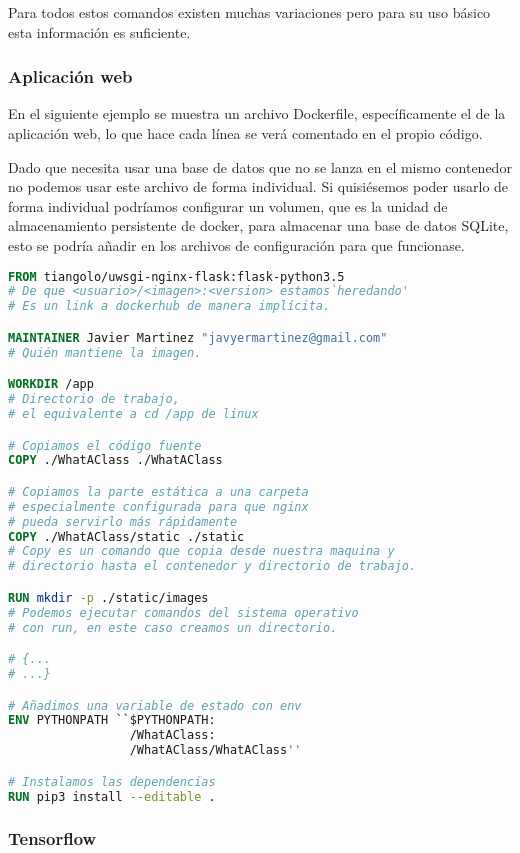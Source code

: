 Para todos estos comandos existen muchas variaciones pero para su uso básico esta información es suficiente.


\subsubsection{Aplicación web}

En el siguiente ejemplo se muestra un archivo Dockerfile, específicamente el de la aplicación web, lo que hace cada línea se verá comentado en el propio código. 

Dado que necesita usar una base de datos que no se lanza en el mismo contenedor no podemos usar este archivo de forma individual. Si quisiésemos poder usarlo de forma individual podríamos configurar un volumen, que es la unidad de almacenamiento persistente de docker, para almacenar una base de datos SQLite, esto se podría añadir en los archivos de configuración para que funcionase.


\lstset{style=blockstyle}
\begin{lstlisting}[language=dockerfile]
FROM tiangolo/uwsgi-nginx-flask:flask-python3.5
# De que <usuario>/<imagen>:<version> estamos`heredando'
# Es un link a dockerhub de manera implícita.

MAINTAINER Javier Martinez "javyermartinez@gmail.com"
# Quién mantiene la imagen.

WORKDIR /app
# Directorio de trabajo, 
# el equivalente a cd /app de linux

# Copiamos el código fuente 
COPY ./WhatAClass ./WhatAClass

# Copiamos la parte estática a una carpeta 
# especialmente configurada para que nginx 
# pueda servirlo más rápidamente
COPY ./WhatAClass/static ./static
# Copy es un comando que copia desde nuestra maquina y 
# directorio hasta el contenedor y directorio de trabajo.

RUN mkdir -p ./static/images
# Podemos ejecutar comandos del sistema operativo 
# con run, en este caso creamos un directorio.

# {...
# ...}

# Añadimos una variable de estado con env
ENV PYTHONPATH ``$PYTHONPATH:
                 /WhatAClass:
                 /WhatAClass/WhatAClass''

# Instalamos las dependencias
RUN pip3 install --editable .
\end{lstlisting}


\subsubsection{Tensorflow}

